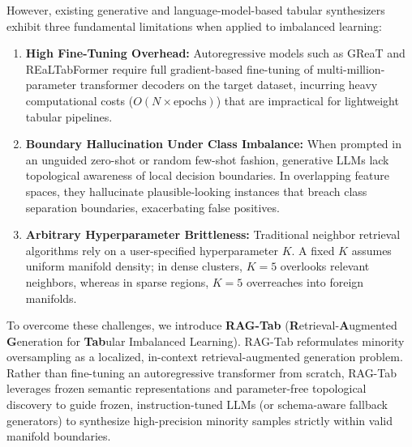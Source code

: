 \documentclass[sn-basic]{sn-jnl}
\begin{document}
However, existing generative and language-model-based tabular synthesizers exhibit three fundamental limitations when applied to imbalanced learning:
\begin{enumerate}
    \item \textbf{High Fine-Tuning Overhead:} Autoregressive models such as GReaT and REaLTabFormer require full gradient-based fine-tuning of multi-million-parameter transformer decoders on the target dataset, incurring heavy computational costs ($O(N \times \text{epochs})$) that are impractical for lightweight tabular pipelines.
    \item \textbf{Boundary Hallucination Under Class Imbalance:} When prompted in an unguided zero-shot or random few-shot fashion, generative LLMs lack topological awareness of local decision boundaries. In overlapping feature spaces, they hallucinate plausible-looking instances that breach class separation boundaries, exacerbating false positives.
    \item \textbf{Arbitrary Hyperparameter Brittleness:} Traditional neighbor retrieval algorithms rely on a user-specified hyperparameter $K$. A fixed $K$ assumes uniform manifold density; in dense clusters, $K=5$ overlooks relevant neighbors, whereas in sparse regions, $K=5$ overreaches into foreign manifolds.
\end{enumerate}

To overcome these challenges, we introduce \textbf{RAG-Tab} (\textbf{R}etrieval-\textbf{A}ugmented \textbf{G}eneration for \textbf{Tab}ular Imbalanced Learning). RAG-Tab reformulates minority oversampling as a localized, in-context retrieval-augmented generation problem. Rather than fine-tuning an autoregressive transformer from scratch, RAG-Tab leverages frozen semantic representations and parameter-free topological discovery to guide frozen, instruction-tuned LLMs (or schema-aware fallback generators) to synthesize high-precision minority samples strictly within valid manifold boundaries.
\end{document}
